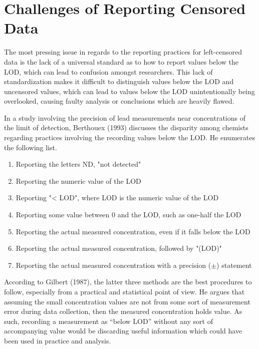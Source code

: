 \documentclass[12pt, twoside]{amherstthesis}
\begin{document}
\hypertarget{challenges}{%
\section{Challenges of Reporting Censored Data}\label{challenges}}

The most pressing issue in regards to the reporting practices for left-censored data is the lack of a universal standard as to how to report values below the LOD, which can lead to confusion amongst researchers. This lack of standardization makes it difficult to distinguish values below the LOD and uncensored values, which can lead to values below the LOD unintentionally being overlooked, causing faulty analysis or conclusions which are heavily flawed.

In a study involving the precision of lead measurements near concentrations of the limit of detection, Berthouex (1993) discusses the disparity among chemists regarding practices involving the recording values below the LOD. He enumerates the following list.
\begin{enumerate}
  \item Reporting the letters ND, "not detected"
  \item Reporting the numeric value of the LOD
  \item Reporting "< LOD", where LOD is the numeric value of the LOD 
  \item Reporting some value between 0 and the LOD, such as one-half the LOD
  \item Reporting the actual measured concentration, even if it falls below the LOD
  \item Reporting the actual measured concentration, followed by "(LOD)" 
  \item Reporting the actual measured concentration with a precision ($\pm$) statement
\end{enumerate}
According to Gilbert (1987), the latter three methods are the best procedures to follow, especially from a practical and statistical point of view. He argues that assuming the small concentration values are not from some sort of measurement error during data collection, then the measured concentration holds value. As such, recording a measurement as ``below LOD'' without any sort of accompanying value would be discarding useful information which could have been used in practice and analysis.
\end{document}

